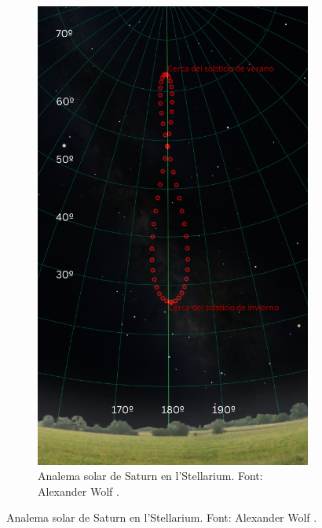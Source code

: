 \documentclass[a4paper, 11pt]{article}
\begin{document}
\begin{figure}[h!]
\begin{subfigure}{0.38\textwidth}
        \includegraphics[width=\textwidth]{images/analema_Terra_stellarium.png}
        \caption{Analema solar de Saturn en l'Stellarium. Font: Alexander Wolf \cite{SCRIPT_STELLARIUM}.}
    \end{subfigure}
\end{figure}


\newpage
\printbibliography
\end{document}
